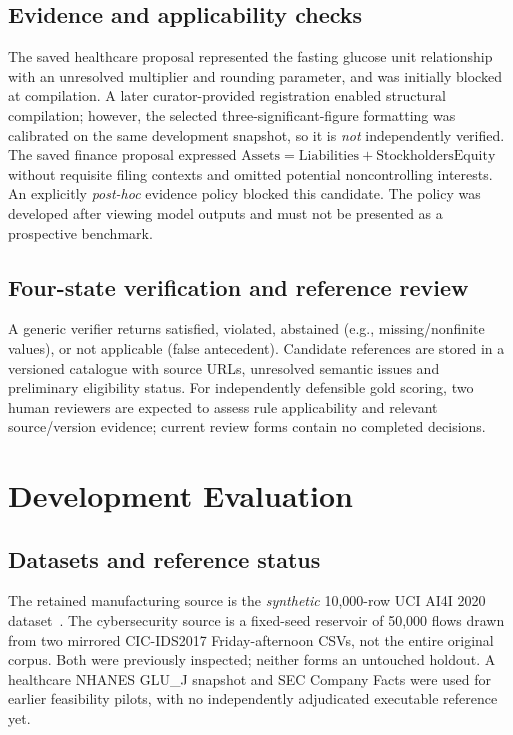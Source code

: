 \documentclass[conference]{IEEEtran}
\begin{document}
\subsection{Evidence and applicability checks}
The saved healthcare proposal represented the fasting glucose unit relationship with an unresolved multiplier and rounding parameter, and was initially blocked at compilation. A later curator-provided registration enabled structural compilation; however, the selected three-significant-figure formatting was calibrated on the same development snapshot, so it is \emph{not} independently verified. The saved finance proposal expressed $\mathrm{Assets}=\mathrm{Liabilities}+\mathrm{StockholdersEquity}$ without requisite filing contexts and omitted potential noncontrolling interests. An explicitly \emph{post-hoc} evidence policy blocked this candidate. The policy was developed after viewing model outputs and must not be presented as a prospective benchmark.

\subsection{Four-state verification and reference review}
A generic verifier returns satisfied, violated, abstained (e.g., missing/nonfinite values), or not applicable (false antecedent). Candidate references are stored in a versioned catalogue with source URLs, unresolved semantic issues and preliminary eligibility status. For independently defensible gold scoring, two human reviewers are expected to assess rule applicability and relevant source/version evidence; current review forms contain no completed decisions.

\section{Development Evaluation}
\subsection{Datasets and reference status}
The retained manufacturing source is the \emph{synthetic} 10,000-row UCI AI4I 2020 dataset~\cite{uci2020ai4i}. The cybersecurity source is a fixed-seed reservoir of 50,000 flows drawn from two mirrored CIC-IDS2017 Friday-afternoon CSVs, not the entire original corpus. Both were previously inspected; neither forms an untouched holdout. A healthcare NHANES GLU\_J snapshot and SEC Company Facts were used for earlier feasibility pilots, with no independently adjudicated executable reference yet.
\end{document}
